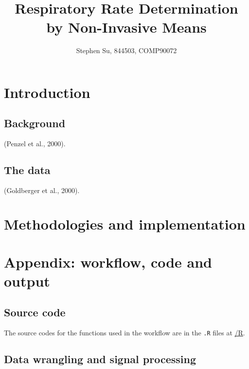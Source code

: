 \documentclass[
]{article}
\title{Respiratory Rate Determination by Non-Invasive Means}
\author{Stephen Su, 844503, COMP90072}
\date{}
\begin{document}
\maketitle

\hypertarget{introduction}{%
\section{Introduction}\label{introduction}}

\hypertarget{background}{%
\subsection{Background}\label{background}}

(Penzel et al., 2000).

\hypertarget{the-data}{%
\subsection{The data}\label{the-data}}

(Goldberger et al., 2000).

\newpage

\hypertarget{methodologies-and-implementation}{%
\section{Methodologies and
implementation}\label{methodologies-and-implementation}}

\newpage

\hypertarget{appendix-workflow-code-and-output}{%
\section{Appendix: workflow, code and
output}\label{appendix-workflow-code-and-output}}

\hypertarget{source-code}{%
\subsection{Source code}\label{source-code}}

The source codes for the functions used in the workflow are in the
\texttt{.R} files at
\href{https://github.com/szmsu2011/comp90072/blob/main/R}{/R}.

\hypertarget{data-wrangling-and-signal-processing}{%
\subsection{Data wrangling and signal
processing}\label{data-wrangling-and-signal-processing}}
\end{document}
